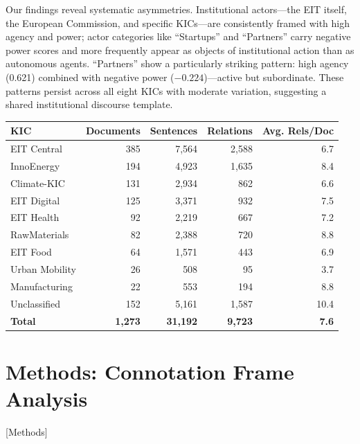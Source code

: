 \documentclass[../main.tex]{subfiles}
\begin{document}
Our findings reveal systematic asymmetries. Institutional actors---the EIT itself, the European Commission, and specific KICs---are consistently framed with high agency and power; actor categories like ``Startups'' and ``Partners'' carry negative power scores and more frequently appear as objects of institutional action than as autonomous agents. ``Partners'' show a particularly striking pattern: high agency (0.621) combined with negative power ($-0.224$)---active but subordinate. These patterns persist across all eight KICs with moderate variation, suggesting a shared institutional discourse template.

\begin{center}
\small
\begin{tabular}{lrrrr}
\toprule
\textbf{KIC} & \textbf{Documents} & \textbf{Sentences} & \textbf{Relations} & \textbf{Avg. Rels/Doc} \\
\midrule
EIT Central & 385 & 7,564 & 2,588 & 6.7 \\
InnoEnergy & 194 & 4,923 & 1,635 & 8.4 \\
Climate-KIC & 131 & 2,934 & 862 & 6.6 \\
EIT Digital & 125 & 3,371 & 932 & 7.5 \\
EIT Health & 92 & 2,219 & 667 & 7.2 \\
RawMaterials & 82 & 2,388 & 720 & 8.8 \\
EIT Food & 64 & 1,571 & 443 & 6.9 \\
Urban Mobility & 26 & 508 & 95 & 3.7 \\
Manufacturing & 22 & 553 & 194 & 8.8 \\
Unclassified & 152 & 5,161 & 1,587 & 10.4 \\
\midrule
\textbf{Total} & \textbf{1,273} & \textbf{31,192} & \textbf{9,723} & \textbf{7.6} \\
\bottomrule
\end{tabular}
\end{center}

\section{Methods: Connotation Frame Analysis}[Methods]
\end{document}
